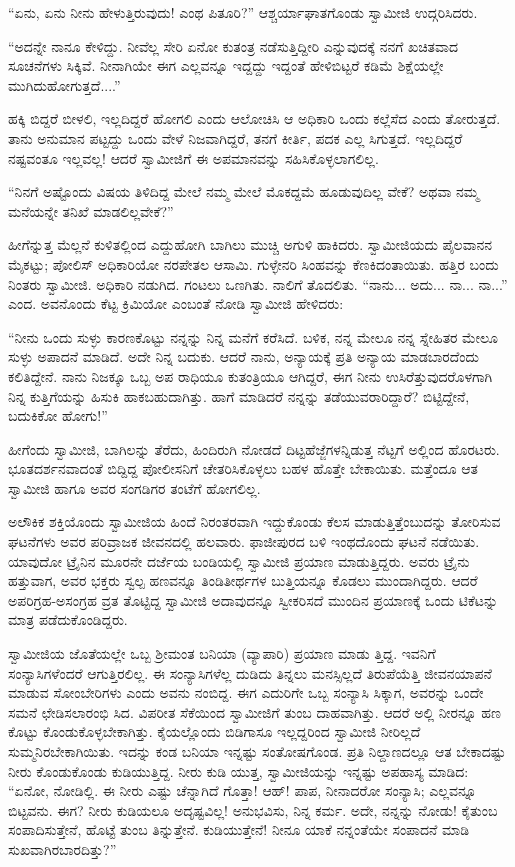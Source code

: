 “ಏನು, ಏನು ನೀನು ಹೇಳುತ್ತಿರುವುದು! ಎಂಥ ಪಿತೂರಿ?” ಆಶ್ಚರ್ಯಾಘಾತಗೊಂಡು ಸ್ವಾಮೀಜಿ ಉದ್ಗರಿಸಿದರು.

“ಅದನ್ನೇ ನಾನೂ ಕೇಳಿದ್ದು. ನೀವೆಲ್ಲ ಸೇರಿ ಏನೋ ಕುತಂತ್ರ ನಡೆಸುತ್ತಿದ್ದೀರಿ ಎನ್ನುವುದಕ್ಕೆ ನನಗೆ ಖಚಿತವಾದ ಸೂಚನೆಗಳು ಸಿಕ್ಕಿವೆ. ನೀನಾಗಿಯೇ ಈಗ ಎಲ್ಲವನ್ನೂ ಇದ್ದದ್ದು ಇದ್ದಂತೆ ಹೇಳಿಬಿಟ್ಟರೆ ಕಡಿಮೆ ಶಿಕ್ಷೆಯಲ್ಲೇ ಮುಗಿದುಹೋಗುತ್ತದೆ....”

ಹಕ್ಕಿ ಬಿದ್ದರೆ ಬೀಳಲಿ, ಇಲ್ಲದಿದ್ದರೆ ಹೋಗಲಿ ಎಂದು ಆಲೋಚಿಸಿ ಆ ಅಧಿಕಾರಿ ಒಂದು ಕಲ್ಲೆಸೆದ ಎಂದು ತೋರುತ್ತದೆ. ತಾನು ಅನುಮಾನ ಪಟ್ಟದ್ದು ಒಂದು ವೇಳೆ ನಿಜವಾಗಿದ್ದರೆ, ತನಗೆ ಕೀರ್ತಿ, ಪದಕ ಎಲ್ಲ ಸಿಗುತ್ತದೆ. ಇಲ್ಲದಿದ್ದರೆ ನಷ್ಟವಂತೂ ಇಲ್ಲವಲ್ಲ! ಆದರೆ ಸ್ವಾಮೀಜಿಗೆ ಈ ಅಪಮಾನವನ್ನು ಸಹಿಸಿಕೊಳ್ಳಲಾಗಲಿಲ್ಲ.

“ನಿನಗೆ ಅಷ್ಟೊಂದು ವಿಷಯ ತಿಳಿದಿದ್ದ ಮೇಲೆ ನಮ್ಮ ಮೇಲೆ ಮೊಕದ್ದಮೆ ಹೂಡುವುದಿಲ್ಲ ವೇಕೆ? ಅಥವಾ ನಮ್ಮ ಮನೆಯನ್ನೇ ತನಿಖೆ ಮಾಡಲಿಲ್ಲವೇಕೆ?”

ಹೀಗೆನ್ನುತ್ತ ಮೆಲ್ಲನೆ ಕುಳಿತಲ್ಲಿಂದ ಎದ್ದುಹೋಗಿ ಬಾಗಿಲು ಮುಚ್ಚಿ ಅಗುಳಿ ಹಾಕಿದರು. ಸ್ವಾಮೀಜಿಯದು ಪೈಲವಾನನ ಮೈಕಟ್ಟು; ಪೋಲಿಸ್ ಅಧಿಕಾರಿಯೋ ನರಪೇತಲ ಆಸಾಮಿ. ಗುಳ್ಳೇನರಿ ಸಿಂಹವನ್ನು ಕೆಣಕಿದಂತಾಯಿತು. ಹತ್ತಿರ ಬಂದು ನಿಂತರು ಸ್ವಾಮೀಜಿ. ಅಧಿಕಾರಿ ನಡುಗಿದ. ಗಂಟಲು ಒಣಗಿತು. ನಾಲಿಗೆ ತೊದಲಿತು. “ನಾನು... ಅದು... ನಾ... ನಾ...” ಎಂದ. ಅವನೊಂದು ಕೆಟ್ಟ ಕ್ರಿಮಿಯೋ ಎಂಬಂತೆ ನೋಡಿ ಸ್ವಾಮೀಜಿ ಹೇಳಿದರು:

“ನೀನು ಒಂದು ಸುಳ್ಳು ಕಾರಣಕೊಟ್ಟು ನನ್ನನ್ನು ನಿನ್ನ ಮನೆಗೆ ಕರೆಸಿದೆ. ಬಳಿಕ, ನನ್ನ ಮೇಲೂ ನನ್ನ ಸ್ನೇಹಿತರ ಮೇಲೂ ಸುಳ್ಳು ಅಪಾದನೆ ಮಾಡಿದೆ. ಅದೇ ನಿನ್ನ ಬದುಕು. ಆದರೆ ನಾನು, ಅನ್ಯಾಯಕ್ಕೆ ಪ್ರತಿ ಅನ್ಯಾಯ ಮಾಡಬಾರದೆಂದು ಕಲಿತಿದ್ದೇನೆ. ನಾನು ನಿಜಕ್ಕೂ ಒಬ್ಬ ಅಪ ರಾಧಿಯೂ ಕುತಂತ್ರಿಯೂ ಆಗಿದ್ದರೆ, ಈಗ ನೀನು ಉಸಿರೆತ್ತುವುದರೊಳಗಾಗಿ ನಿನ್ನ ಕುತ್ತಿಗೆಯನ್ನು ಹಿಸುಕಿ ಹಾಕಬಹುದಾಗಿತ್ತು. ಹಾಗೆ ಮಾಡಿದರೆ ನನ್ನನ್ನು ತಡೆಯುವರಾರಿದ್ದಾರೆ? ಬಿಟ್ಟಿದ್ದೇನೆ, ಬದುಕಿಕೋ ಹೋಗು!”

ಹೀಗೆಂದು ಸ್ವಾಮೀಜಿ, ಬಾಗಿಲನ್ನು ತೆರೆದು, ಹಿಂದಿರುಗಿ ನೋಡದೆ ದಿಟ್ಟಹೆಜ್ಜೆಗಳನ್ನಿಡುತ್ತ ನೆಟ್ಟಗೆ ಅಲ್ಲಿಂದ ಹೊರಟರು. ಭೂತದರ್ಶನವಾದಂತೆ ಬಿದ್ದಿದ್ದ ಪೋಲೀಸನಿಗೆ ಚೇತರಿಸಿಕೊಳ್ಳಲು ಬಹಳ ಹೊತ್ತೇ ಬೇಕಾಯಿತು. ಮತ್ತೆಂದೂ ಆತ ಸ್ವಾಮೀಜಿ ಹಾಗೂ ಅವರ ಸಂಗಡಿಗರ ತಂಟೆಗೆ ಹೋಗಲಿಲ್ಲ.

ಅಲೌಕಿಕ ಶಕ್ತಿಯೊಂದು ಸ್ವಾಮೀಜಿಯ ಹಿಂದೆ ನಿರಂತರವಾಗಿ ಇದ್ದುಕೊಂಡು ಕೆಲಸ ಮಾಡುತ್ತಿತ್ತೆಂಬುದನ್ನು ತೋರಿಸುವ ಘಟನೆಗಳು ಅವರ ಪರಿವ್ರಾಜಕ ಜೀವನದಲ್ಲಿ ಹಲವಾರು. ಫಾಜೀಪುರದ ಬಳಿ ಇಂಥದೊಂದು ಘಟನೆ ನಡೆಯಿತು. ಯಾವುದೋ ಟ್ರೈನಿನ ಮೂರನೇ ದರ್ಜೆಯ ಬಂಡಿಯಲ್ಲಿ ಸ್ವಾಮೀಜಿ ಪ್ರಯಾಣ ಮಾಡುತ್ತಿದ್ದರು. ಅವರು ಟ್ರೈನು ಹತ್ತುವಾಗ, ಅವರ ಭಕ್ತರು ಸ್ವಲ್ಪ ಹಣವನ್ನೂ ತಿಂಡಿತೀರ್ಥಗಳ ಬುತ್ತಿಯನ್ನೂ ಕೊಡಲು ಮುಂದಾಗಿದ್ದರು. ಆದರೆ ಅಪರಿಗ್ರಹ-ಅಸಂಗ್ರಹ ವ್ರತ ತೊಟ್ಟಿದ್ದ ಸ್ವಾಮೀಜಿ ಅದಾವುದನ್ನೂ ಸ್ವೀಕರಿಸದೆ ಮುಂದಿನ ಪ್ರಯಾಣಕ್ಕೆ ಒಂದು ಟಿಕೆಟನ್ನು ಮಾತ್ರ ಪಡೆದುಕೊಂಡಿದ್ದರು.

ಸ್ವಾಮೀಜಿಯ ಜೊತೆಯಲ್ಲೇ ಒಬ್ಬ ಶ್ರೀಮಂತ ಬನಿಯಾ (ವ್ಯಾಪಾರಿ) ಪ್ರಯಾಣ ಮಾಡು ತ್ತಿದ್ದ. ಇವನಿಗೆ ಸಂನ್ಯಾಸಿಗಳೆಂದರೆ ಆಗುತ್ತಿರಲಿಲ್ಲ. ಈ ಸಂನ್ಯಾಸಿಗಳೆಲ್ಲ ದುಡಿದು ತಿನ್ನಲು ಮನಸ್ಸಿಲ್ಲದೆ ತಿರುಪೆಯೆತ್ತಿ ಜೀವನಯಾಪನೆ ಮಾಡುವ ಸೋಂಬೇರಿಗಳು ಎಂದು ಅವನು ನಂಬಿದ್ದ. ಈಗ ಎದುರಿಗೇ ಒಬ್ಬ ಸಂನ್ಯಾಸಿ ಸಿಕ್ಕಾಗ, ಅವರನ್ನು ಒಂದೇ ಸಮನೆ ಛೇಡಿಸಲಾರಂಭಿ ಸಿದ. ವಿಪರೀತ ಸೆಕೆಯಿಂದ ಸ್ವಾಮೀಜಿಗೆ ತುಂಬ ದಾಹವಾಗಿತ್ತು. ಆದರೆ ಅಲ್ಲಿ ನೀರನ್ನೂ ಹಣ ಕೊಟ್ಟು ಕೊಂಡುಕೊಳ್ಳಬೇಕಾಗಿತ್ತು. ಕೈಯಲ್ಲೊಂದು ಬಿಡಿಗಾಸೂ ಇಲ್ಲದ್ದರಿಂದ ಸ್ವಾಮೀಜಿ ನೀರಿಲ್ಲದೆ ಸುಮ್ಮನಿರಬೇಕಾಗಿಯಿತು. ಇದನ್ನು ಕಂಡ ಬನಿಯಾ ಇನ್ನಷ್ಟು ಸಂತೋಷಗೊಂಡ. ಪ್ರತಿ ನಿಲ್ದಾಣದಲ್ಲೂ ಆತ ಬೇಕಾದಷ್ಟು ನೀರು ಕೊಂಡುಕೊಂಡು ಕುಡಿಯುತ್ತಿದ್ದ. ನೀರು ಕುಡಿ ಯುತ್ತ, ಸ್ವಾಮೀಜಿಯನ್ನು ಇನ್ನಷ್ಟು ಅಪಹಾಸ್ಯ ಮಾಡಿದ: “ಏನೋ, ನೋಡಿಲ್ಲಿ. ಈ ನೀರು ಎಷ್ಟು ಚೆನ್ನಾಗಿದೆ ಗೊತ್ತಾ! ಆಹ್! ಪಾಪ, ನೀನಾದರೋ ಸಂನ್ಯಾಸಿ; ಎಲ್ಲವನ್ನೂ ಬಿಟ್ಟವನು. ಈಗ? ನೀರು ಕುಡಿಯಲೂ ಅದೃಷ್ಟವಿಲ್ಲ! ಅನುಭವಿಸು, ನಿನ್ನ ಕರ್ಮ. ಅದೇ, ನನ್ನನ್ನು ನೋಡು! ಕೈತುಂಬ ಸಂಪಾದಿಸುತ್ತೇನೆ, ಹೊಟ್ಟೆ ತುಂಬ ತಿನ್ನುತ್ತೇನೆ. ಕುಡಿಯುತ್ತೇನೆ! ನೀನೂ ಯಾಕೆ ನನ್ನಂತೆಯೇ ಸಂಪಾದನೆ ಮಾಡಿ ಸುಖವಾಗಿರಬಾರದಿತ್ತು?”

